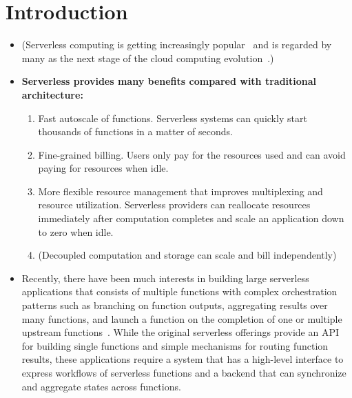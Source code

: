\section{Introduction}

\begin{itemize}

  \item (Serverless computing is getting increasingly
  popular~\cite{datadog-state-of-serverless} and is regarded by many as the
  next stage of the cloud computing evolution~\cite{berkeley}.)

  \item \textbf{Serverless provides many benefits compared with traditional
  architecture: }

    \begin{enumerate}

      \item Fast autoscale of functions. Serverless systems can quickly start
      thousands of functions in a matter of seconds.

      \item Fine-grained billing. Users only pay for the resources used and
      can avoid paying for resources when idle.

      \item More flexible resource management that improves multiplexing and
      resource utilization. Serverless providers can reallocate resources
      immediately after computation completes and scale an application down to
      zero when idle.

      \item (Decoupled computation and storage can scale and bill
      independently)

    \end{enumerate}

  \item Recently, there have been much interests in building large serverless
  applications that consists of multiple functions with complex orchestration
  patterns such as branching on function outputs, aggregating results over
  many functions, and launch a function on the completion of one or multiple
  upstream functions~\cite{excamera, kappa, pywren, google-workflows,
  durable-functions, gg-atc}. While the original serverless offerings provide
  an API for building single functions and simple mechanisms for routing
  function results, these applications require a system that has a high-level
  interface to express workflows of serverless functions and a backend that
  can synchronize and aggregate states across functions.


\end{itemize}
